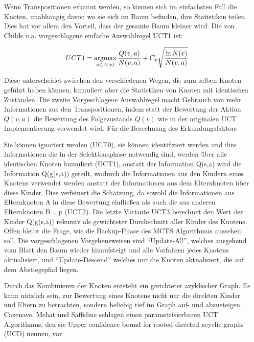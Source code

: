 Wenn Transpositionen erkannt werden, so können sich im einfachsten Fall die Knoten, unabhängig davon wo sie sich im Baum befinden, ihre Statistiken teilen. Dies hat vor allem den Vorteil, dass der gesamte Baum kleiner wird. Die von Childs u.a. vorgeschlagene einfache Auswahlregel UCT1 ist:

\begin{equation}
UCT1 = \operatorname*{argmax}_{a \in A(v)} \frac{Q(v,a)}{N(v,a)} + C_p\sqrt{\frac{\ln N(v)}{N(v,a)}}
\label{eqn:UCT1}
\end{equation}

Diese unterscheidet zwischen den verschiedenen Wegen, die zum selben Knoten geführt haben können, kumuliert aber die Statistiken von Knoten mit identischen Zuständen. Die zweite Vorgeschlagene Auswahlregel macht Gebrauch von mehr Informationen aus den Transpositionen, indem statt der Bewertung der Aktion $Q(v,a)$ die Bewertung des Folgezustands $Q(v)$ wie in der originalen UCT Implementierung verwendet wird. Für die Berechnung des Erkundungsfaktors 

Sie können ignoriert werden (UCT0), sie können identifiziert werden und ihre Informationen die in der Selektionsphase notwendig sind, werden über alle identischen Knoten kumuliert (UCT1), anstatt der Information Q(s,a) wird die Information Q(g(s,a)) geteilt, wodurch die Informationen aus den Kindern eines Knotens verwendet werden anstatt der Informationen aus dem Elternknoten über diese Kinder. Dies verfeinert die Schätzung, da sowohl die Informationen aus Elternknoten A in diese Bewertung einfließen als auch die aus anderen Elternknoten B .. p (UCT2). Die letzte Variante UCT3 berechnet den Wert der Kinder Q(g(s,a)) rekursiv als gewichteter Durchschnitt aller Kinder des Knotens. Offen bleibt die Frage, wie die Backup-Phase des MCTS Algorithmus aussehen soll. Die vorgeschlagenen Vorgehensweisen sind “Update-All”, welches ausgehend vom Blatt den Baum wieder hinaufsteigt und alle Vorfahren jedes Knotens aktualisiert, und “Update-Descend” welches nur die Knoten aktualisiert, die auf dem Abstiegspfad liegen.\\
\par
Durch das Kombinieren der Knoten entsteht ein gerichteter azyklischer Graph. Es kann nützlich sein, zur Bewertung eines Knotens nicht nur die direkten Kinder und Eltern zu betrachten, sondern beliebig tief im Graph auf- und abzusteigen. Cazenave, Mehat und Saffidine schlagen einen parametrisierbaren UCT Algorithmus, den sie Upper confidence bound for rooted directed acyclic graphs (UCD) nennen, vor.


